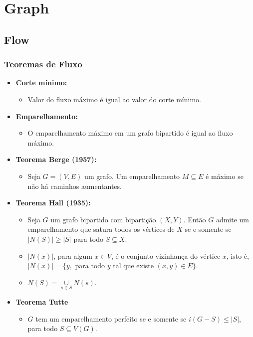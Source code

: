 \chapter{Graph}
    \section{Flow}
    \subsection{Teoremas de Fluxo}
    \begin{itemize}
        \item \textbf{Corte mínimo:}
        \begin{itemize}
            \item Valor do fluxo máximo é igual ao valor do corte mínimo.
        \end{itemize}
        \item \textbf{Emparelhamento:}
        \begin{itemize}
            \item O emparelhamento máximo em um grafo bipartido é igual ao fluxo máximo.
        \end{itemize}
        \item \textbf{Teorema Berge (1957):}
        \begin{itemize}
            \item Seja $G=(V, E)$ um grafo. Um emparelhamento $M \subseteq E$ é máximo se não há caminhos aumentantes.
        \end{itemize}
        \item \textbf{Teorema Hall (1935):}
        \begin{itemize}
            \item Seja $G$ um grafo bipartido com bipartição $(X, Y)$. Então $G$ admite um emparelhamento que satura todos os vértices de $X$ se e somente se $|N(S)| \ge |S|$ para todo $S \subseteq X$.
            \item $|N(x)|$, para algum $x \in V$, é o conjunto vizinhança do vértice $x$, isto é, $|N(x)| = \{y,$ para todo $y$ tal que existe $(x, y)\in E\}$.
            \item $N(S)=\underset{s\in S}{\cup} N(s)$.
        \end{itemize}
        \item \textbf{Teorema Tutte}
        \begin{itemize}
            \item $G$ tem um emparelhamento perfeito se e somente se $i(G-S) \le |S|$, para todo $S \subseteq V(G)$.

\end{itemize}
\end{itemize}
